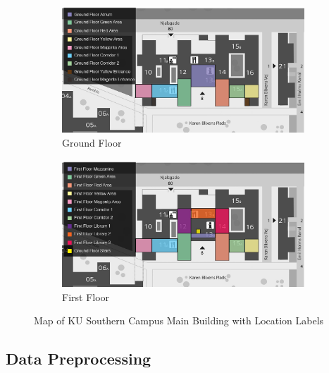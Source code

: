 \documentclass{article}
\begin{document}
  \begin{figure}[ht]
    \centering
    \begin{subfigure}[b]{0.49\linewidth}
      \centering
      \includegraphics[width=\linewidth]{figures/map-ground-floor.jpg}
      \caption{Ground Floor}
      \label{fig:map-ground-floor}
    \end{subfigure}
    \hfill
    \begin{subfigure}[b]{0.49\linewidth}
      \centering
      \includegraphics[width=\linewidth]{figures/map-first-floor.jpg}
      \caption{First Floor}
      \label{fig:map-first-floor}
    \end{subfigure}
    \caption{Map of KU Southern Campus Main Building with Location Labels}
    \label{fig:map}
  \end{figure}



  \subsection{Data Preprocessing} %
  \label{sub:data-preprocessing}
\end{document}
